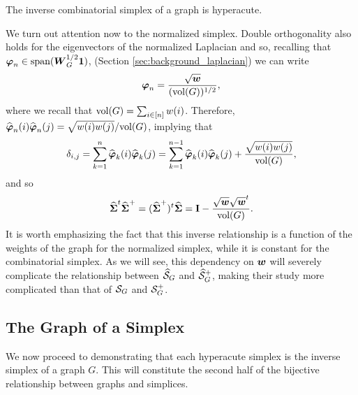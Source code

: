 \begin{observation}
	\label{obs:S^+_hyperacute}
	The inverse combinatorial simplex of a graph is hyperacute. 
\end{observation}

We turn out attention now to the normalized simplex. Double orthogonality also holds for the eigenvectors of the normalized Laplacian and so, recalling that $\vb*{\varphi}_n \in \textnormal{span}(\vb*{W}_G^{1/2}\vb{1} )$, 
(Section \ref{sec:background_laplacian}) 
we can write 
\[\vb*{\varphi}_n = \frac{\sqrt{\vb*{w}}}{(\textnormal{vol}(G))^{1/2}},\]
where we recall that $\textnormal{vol}(G)=\sum_{i\in[n]} w(i)$. 
Therefore, $\widehat{\vb*{\varphi}}_{n}(i)\widehat{\vb*{\varphi}}_{n}(j)=\sqrt{w(i)w(j)}/\textnormal{vol}(G)$, implying that 
\begin{equation*}\delta_{i,j}=\sum_{k=1}^n \widehat{\vb*{\varphi}}_k(i)\widehat{\vb*{\varphi}}_k(j) = \sum_{k=1}^{n-1} \widehat{\vb*{\varphi}}_k(i)\widehat{\vb*{\varphi}}_k(j) + \frac{\sqrt{w(i)w(j)}}{\textnormal{vol}(G)},
\end{equation*}
and so 
\begin{equation}
\label{eq:svn+svn}
\widehat{\boldsymbol{\Sigma}}^t\widehat{\boldsymbol{\Sigma}}^+=(\widehat{\boldsymbol{\Sigma}}^+)^t\widehat{\boldsymbol{\Sigma}}=\vb{I}-\frac{\sqrt{\vb*{w}}\sqrt{\vb*{w}}^t}{\textnormal{vol}(G)}.
\end{equation}
It is worth emphasizing the fact that this inverse relationship is a function of the weights of the graph for the normalized simplex, while it is constant for the combinatorial simplex. As we will see, this dependency on $\vb*{w}$ will severely complicate the relationship between $\widehat{\mathcal{S}}_G$ and $\widehat{\mathcal{S}}_G^+$, making their study more complicated than that of $\mathcal{S}_G$ and $\mathcal{S}_G^+$. 


\subsection{The Graph of a Simplex}
\label{sec:simplex_to_graph}
We now proceed to demonstrating that  each hyperacute simplex is the inverse simplex of a graph $G$. This will constitute the second half of the bijective relationship between graphs and simplices. 

